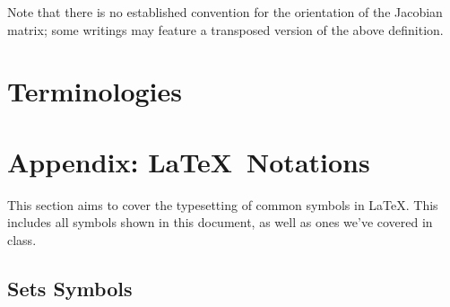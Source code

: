 \documentclass[12pt]{article}
\theoremstyle{definition}
\begin{document}
 	Note that there is no established convention for the orientation of the Jacobian matrix; some writings may feature a transposed version of the above definition.
 	
 	\section{Terminologies}
 	\label{sec:terms}
 	
 	\section{Appendix: \LaTeX\ Notations}
 	
 	This section aims to cover the typesetting of common symbols in \LaTeX.	 This includes all symbols shown in this document, as well as ones we've covered in class.
 	
 	\subsection{Sets Symbols}
 	
\end{document}
